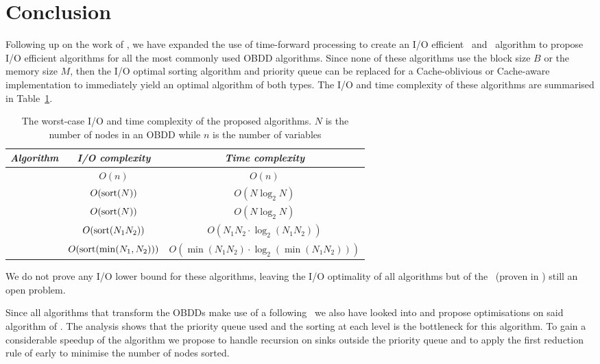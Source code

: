 \section{Conclusion} \label{sec:conclusion}
Following up on the work of \cite{Arge96}, we have expanded the use of
time-forward processing to create an I/O efficient \Reduce\ and \Apply\
algorithm to propose I/O efficient algorithms for all the most commonly used
OBDD algorithms. Since none of these algorithms use the block size $B$ or the
memory size $M$, then the I/O optimal sorting algorithm and priority queue can
be replaced for a Cache-oblivious or Cache-aware implementation to immediately
yield an optimal algorithm of both types. The I/O and time complexity of these
algorithms are summarised in Table~\ref{tab:summary_efficiency}.

\begin{table}[ht!]
  \centering
  \begin{tabular}{c | c | c}
    \emph{Algorithm} & \emph{I/O complexity} & \emph{Time complexity}
    \\ \hline
    \Evaluate & $O(n)$ & $O(n)$
    \\
    \Reduce & $O(\text{sort}(N))$ & $O(N \log_2 N)$
    \\
    \Restrict & $O(\text{sort}(N))$ & $O(N \log_2 N)$
    \\
    \Apply & $O(\text{sort}(N_1 N_2))$ & $O(N_1 N_2 \cdot \log_2 (N_1 N_2))$
    \\
    \Equal & $O(\text{sort}(\min(N_1, N_2)))$ & $O(\min(N_1 N_2) \cdot \log_2 (\min(N_1 N_2)))$
    \\
  \end{tabular}
  \caption{The worst-case I/O and time complexity of the proposed algorithms.
    $N$ is the number of nodes in an OBDD while $n$ is the number of variables}
  \label{tab:summary_efficiency}
\end{table}

We do not prove any I/O lower bound for these algorithms, leaving the
I/O optimality of all algorithms but of the \Reduce\ (proven in \cite{Arge96})
still an open problem.

Since all algorithms that transform the OBDDs make use of a following \Reduce\
we also have looked into and propose optimisations on said algorithm of
\cite{Arge96}. The analysis shows that the priority queue used and the sorting
at each level is the bottleneck for this algorithm. To gain a considerable
speedup of the algorithm we propose to handle recursion on sinks outside the
priority queue and to apply the first reduction rule of \cite{Bryant86} early to
minimise the number of nodes sorted.


